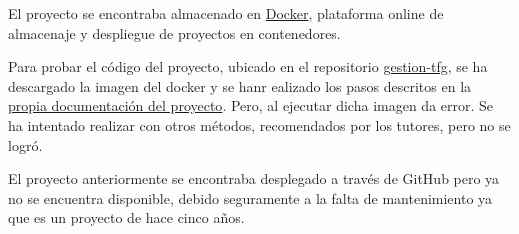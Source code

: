 El proyecto se encontraba almacenado en \href{https://www.docker.com/}{Docker}, plataforma online de almacenaje y despliegue de proyectos en contenedores. 

Para probar el código del proyecto, ubicado en el repositorio \href{https://github.com/gabriel-stan/gestion-tfg}{gestion-tfg}, se ha descargado la imagen del docker y se hanr ealizado los pasos descritos en la \href{https://github.com/gabriel-stan/gestion-tfg/blob/master/docs/README-contenerizacion.md}{propia documentación del proyecto}. Pero, al ejecutar dicha imagen da error. Se ha intentado realizar con otros métodos, recomendados por los tutores, pero no se logró.

El proyecto anteriormente se encontraba desplegado a través de GitHub pero ya no se encuentra disponible, debido seguramente a la falta de mantenimiento ya que es un proyecto de hace cinco años. 


                                                                                                                                





